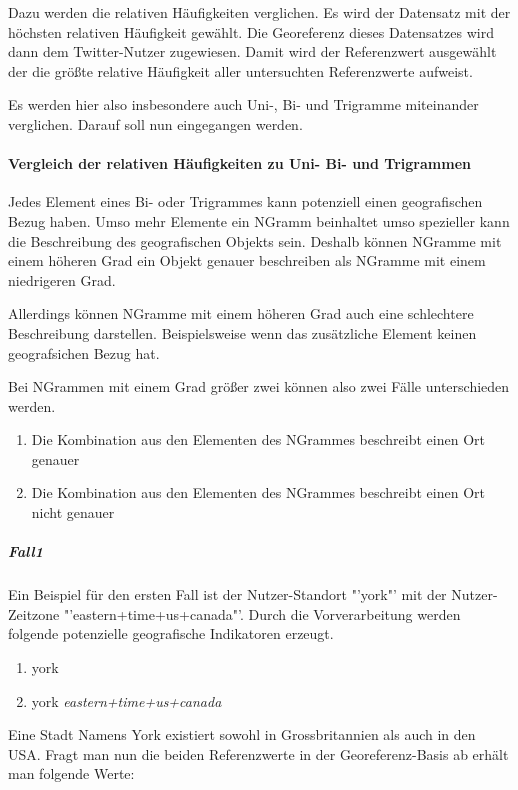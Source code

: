 				Dazu werden die relativen Häufigkeiten verglichen.
				Es wird der Datensatz mit der höchsten relativen Häufigkeit gewählt.
				Die Georeferenz dieses Datensatzes wird dann dem Twitter-Nutzer zugewiesen. 
				Damit wird der Referenzwert ausgewählt der die größte relative Häufigkeit aller untersuchten Referenzwerte aufweist. 

				
				Es werden hier also insbesondere auch Uni-, Bi- und Trigramme miteinander verglichen.
				Darauf soll nun eingegangen werden.

				\paragraph{Vergleich der relativen Häufigkeiten zu Uni- Bi- und Trigrammen}

					Jedes Element eines Bi- oder Trigrammes kann potenziell einen geografischen Bezug haben. 
					Umso mehr Elemente ein NGramm beinhaltet umso spezieller kann die Beschreibung des geografischen Objekts sein.
					Deshalb können NGramme mit einem höheren Grad ein Objekt genauer beschreiben als NGramme mit einem niedrigeren Grad.

					Allerdings können NGramme mit einem höheren Grad auch eine schlechtere Beschreibung darstellen. 
					Beispielsweise wenn das zusätzliche Element keinen geografsichen Bezug hat.

					Bei NGrammen mit einem Grad größer zwei können also zwei Fälle unterschieden werden.

					\begin{enumerate}
						\item Die Kombination aus den Elementen des NGrammes beschreibt einen Ort genauer
						\item Die Kombination aus den Elementen des NGrammes beschreibt einen Ort nicht genauer
					\end{enumerate}

					\subparagraph{Fall1} 

						Ein Beispiel für den ersten Fall ist der Nutzer-Standort "'york"' mit der Nutzer-Zeitzone "'eastern+time+us+canada"'. 
						Durch die Vorverarbeitung werden folgende potenzielle geografische Indikatoren erzeugt.
						\begin{enumerate}		
							\item york
							\item york \textit{eastern+time+us+canada}
						\end{enumerate}		

						Eine Stadt Namens York existiert sowohl in Grossbritannien als auch in den USA.
						Fragt man nun die beiden Referenzwerte in der Georeferenz-Basis ab erhält man folgende Werte:

